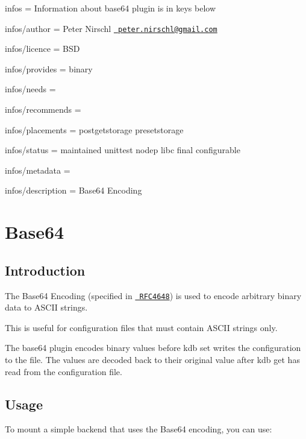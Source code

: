 
\begin{DoxyItemize}
\item infos = Information about base64 plugin is in keys below
\item infos/author = Peter Nirschl \href{mailto:peter.nirschl@gmail.com}{\texttt{ peter.\+nirschl@gmail.\+com}}
\item infos/licence = B\+SD
\item infos/provides = binary
\item infos/needs =
\item infos/recommends =
\item infos/placements = postgetstorage presetstorage
\item infos/status = maintained unittest nodep libc final configurable
\item infos/metadata =
\item infos/description = Base64 Encoding
\end{DoxyItemize}\hypertarget{autotoc_md52_src_plugins_base64_README_md}{}\section{Base64}\label{autotoc_md52_src_plugins_base64_README_md}
\hypertarget{autotoc_md52_autotoc_md53}{}\subsection{Introduction}\label{autotoc_md52_autotoc_md53}
The Base64 Encoding (specified in \href{https://www.ietf.org/rfc/rfc4648.txt}{\texttt{ R\+F\+C4648}}) is used to encode arbitrary binary data to A\+S\+C\+II strings.

This is useful for configuration files that must contain A\+S\+C\+II strings only.

The {\ttfamily base64} plugin encodes binary values before {\ttfamily kdb set} writes the configuration to the file. The values are decoded back to their original value after {\ttfamily kdb get} has read from the configuration file.\hypertarget{autotoc_md52_autotoc_md54}{}\subsection{Usage}\label{autotoc_md52_autotoc_md54}
To mount a simple backend that uses the Base64 encoding, you can use\+:


\begin{DoxyCode}{0}
\end{DoxyCode}


